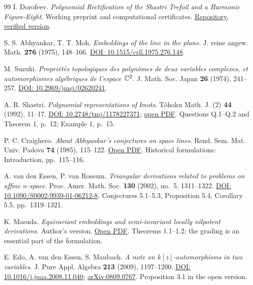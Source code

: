 \begin{thebibliography}{99}
\small\setlength{\itemsep}{6pt}
 I. Dorofeev.
\emph{Polynomial Rectification of the Shastri Trefoil and a Harmonic
Figure-Eight}. Working preprint and computational certificates.
\href{https://github.com/qft98romanov-hash/abhyankar-moh-trefoil/tree/b954f3609e900761fddc9c8ff03d8301e9604cab}{Repository, verified version}.

 S. S. Abhyankar, T. T. Moh.
\emph{Embeddings of the line in the plane}.
J. reine angew. Math. \textbf{276} (1975), 148--166.
\href{https://doi.org/10.1515/crll.1975.276.148}{DOI: 10.1515/crll.1975.276.148}.

 M. Suzuki.
\emph{Propriétés topologiques des polynômes de deux variables complexes,
et automorphismes algébriques de l'espace ${\mathbb{C}}^2$}.
J. Math. Soc. Japan \textbf{26} (1974), 241--257.
\href{https://doi.org/10.2969/jmsj/02620241}{DOI: 10.2969/jmsj/02620241}.

 A. R. Shastri.
\emph{Polynomial representations of knots}.
Tôhoku Math. J. (2) \textbf{44} (1992), 11--17.
\href{https://doi.org/10.2748/tmj/1178227371}{DOI: 10.2748/tmj/1178227371};
\href{https://www.jstage.jst.go.jp/article/tmj1949/44/1/44_1_11/_pdf}{open PDF}.
Questions Q.1--Q.2 and Theorem 1, p.~12; Example 1, p.~15.

 P. C. Craighero.
\emph{About Abhyankar's conjectures on space lines}.
Rend. Sem. Mat. Univ. Padova \textbf{74} (1985), 115--122.
\href{https://www.numdam.org/item/RSMUP_1985__74__115_0.pdf}{Open PDF}.
Historical formulations: Introduction, pp.~115--116.

 A. van den Essen, P. van Rossum.
\emph{Triangular derivations related to problems on affine $n$-space}.
Proc. Amer. Math. Soc. \textbf{130} (2002), no.~5, 1311--1322.
\href{https://doi.org/10.1090/S0002-9939-01-06212-8}{DOI: 10.1090/S0002-9939-01-06212-8}.
Conjectures 5.1--5.3, Proposition 5.4, Corollary 5.5, pp.~1319--1321.

 K. Masuda.
\emph{Equivariant embeddings and semi-invariant locally nilpotent
derivations}. Author's version.
\href{https://sci-tech.ksc.kwansei.ac.jp/~kayo/cmn/papers/eembed.pdf}{Open PDF}.
Theorems 1.1--1.2; the grading is an essential part of the formulation.

 E. Edo, A. van den Essen, S. Maubach.
\emph{A note on $k[z]$-automorphisms in two variables}.
J. Pure Appl. Algebra \textbf{213} (2009), 1197--1200.
\href{https://doi.org/10.1016/j.jpaa.2008.11.040}{DOI: 10.1016/j.jpaa.2008.11.040};
\href{https://arxiv.org/abs/0809.0767}{arXiv:0809.0767}.
Proposition 3.1 in the open version.


\end{thebibliography}
